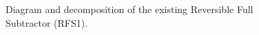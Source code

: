 \documentclass[%
reprint,
 amsmath,amssymb,
 aps,
]{revtex4-1}
\begin{document}
\begin{figure}%
\begin{minipage}{2.1in}%
\raggedright
{}
\end{minipage}%
\hspace{7em}
\parbox{1.2in}{
}%

\caption{Diagram and decomposition of the existing Reversible Full Subtractor (RFS1).}%
\label{fig:proposed RFS1}%
\end{figure}
\end{document}
